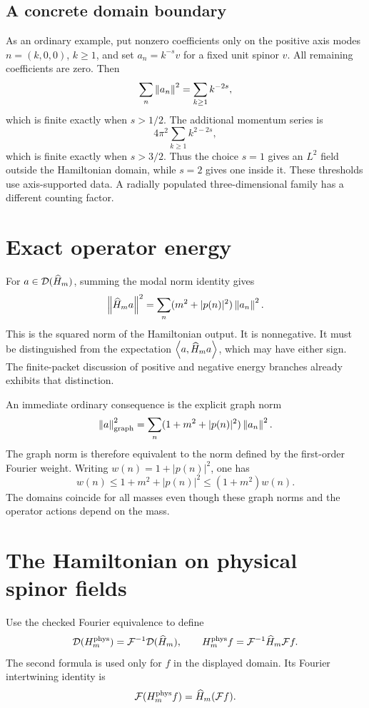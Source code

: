 \subsection{A concrete domain boundary}
As an ordinary example, put nonzero coefficients only on the positive axis modes $n=(k,0,0)$, $k\ge1$, and set $a_n=k^{-s}v$ for a fixed unit spinor $v$. All remaining coefficients are zero. Then
\[
\sum_n\left\lVert a_n\right\rVert^2=\sum_{k\ge1}k^{-2s},
\]
which is finite exactly when $s>1/2$. The additional momentum series is
\[
4\pi^2\sum_{k\ge1}k^{2-2s},
\]
which is finite exactly when $s>3/2$. Thus the choice $s=1$ gives an $L^2$ field outside the Hamiltonian domain, while $s=2$ gives one inside it. These thresholds use axis-supported data. A radially populated three-dimensional family has a different counting factor.


\section{Exact operator energy}
For $a\in\mathcal D(\widehat H_m)$, summing the modal norm identity gives
\[
\left\lVert\widehat H_ma\right\rVert^2
=\sum_n(m^2+|p(n)|^2)\left\lVert a_n\right\rVert^2.
\]
This is the squared norm of the Hamiltonian output. It is nonnegative. It must be distinguished from the expectation $\left\langle a,\widehat H_ma\right\rangle$, which may have either sign. The finite-packet discussion of positive and negative energy branches already exhibits that distinction.

An immediate ordinary consequence is the explicit graph norm
\[
\left\lVert a\right\rVert_{\mathrm{graph}}^2
=\sum_n(1+m^2+|p(n)|^2)\left\lVert a_n\right\rVert^2.
\]
The graph norm is therefore equivalent to the norm defined by the first-order Fourier weight. Writing $w(n)=1+|p(n)|^2$, one has
\[
w(n)\le1+m^2+|p(n)|^2\le(1+m^2)w(n).
\]
The domains coincide for all masses even though these graph norms and the operator actions depend on the mass.

\section{The Hamiltonian on physical spinor fields}
Use the checked Fourier equivalence to define
\[
\mathcal D(H_m^{\mathrm{phys}})=\mathcal F^{-1}\mathcal D(\widehat H_m),
\qquad
H_m^{\mathrm{phys}}f=\mathcal F^{-1}\widehat H_m\mathcal F f.
\]
The second formula is used only for $f$ in the displayed domain. Its Fourier intertwining identity is
\[
\mathcal F(H_m^{\mathrm{phys}}f)=\widehat H_m(\mathcal F f).
\]

